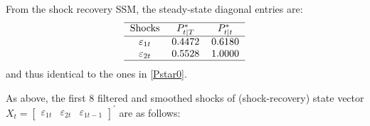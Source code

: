 \documentclass[a4paper,12pt]{article}
\begin{document}
From the shock recovery SSM, the steady-state diagonal entries are:%
\begin{equation}
\begin{tabular}{ccc}
\hline
Shocks & $P_{t|T}^{\ast }$ & $P_{t|t}^{\ast }$ \\ \hline
$\varepsilon _{1t}$ & $0.4472$ & $0.6180$ \\ 
$\varepsilon _{2t}$ & $0.5528$ & $1.0000$ \\ \hline
\end{tabular}%
\end{equation}%
and thus identical to the ones in \ref{Pstar0}.

As above, the first 8 filtered and smoothed shocks of (shock-recovery) state
vector $X_{t}=%
\begin{bmatrix}
\varepsilon _{1t} & \varepsilon _{2t} & \varepsilon _{1t-1}%
\end{bmatrix}%
^{\prime }$ are as follows:
\end{document}

